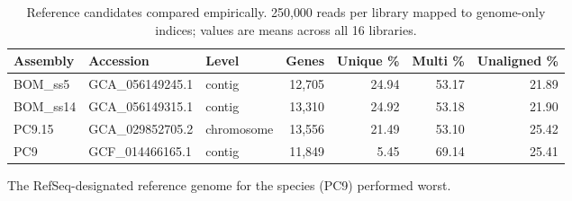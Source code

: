 \begin{table}[htbp]
\caption{Reference candidates compared empirically. 250{,}000 reads per library mapped to genome-only indices; values are means across all 16 libraries.}\label{tab:refs}
\footnotesize
\begin{tabular}{@{}lllrrrr@{}}
\toprule
Assembly & Accession & Level & Genes & Unique \% & Multi \% & Unaligned \% \\
\midrule
BOM\_ss5 & GCA\_056149245.1 & contig & 12,705 & 24.94 & 53.17 & 21.89 \\
BOM\_ss14 & GCA\_056149315.1 & contig & 13,310 & 24.92 & 53.18 & 21.90 \\
PC9.15 & GCA\_029852705.2 & chromosome & 13,556 & 21.49 & 53.10 & 25.42 \\
PC9 & GCF\_014466165.1 & contig & 11,849 & 5.45 & 69.14 & 25.41 \\
\bottomrule
\end{tabular}
\begin{tablenotes}[flushleft]\footnotesize\item The RefSeq-designated reference genome for the species (PC9) performed worst.\end{tablenotes}
\end{table}
